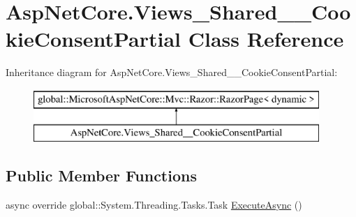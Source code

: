 \hypertarget{class_asp_net_core_1_1_views___shared_____cookie_consent_partial}{}\section{Asp\+Net\+Core.\+Views\+\_\+\+Shared\+\_\+\+\_\+\+Cookie\+Consent\+Partial Class Reference}
\label{class_asp_net_core_1_1_views___shared_____cookie_consent_partial}
Inheritance diagram for Asp\+Net\+Core.\+Views\+\_\+\+Shared\+\_\+\+\_\+\+Cookie\+Consent\+Partial\+:\begin{figure}[H]
\begin{center}
\leavevmode
\includegraphics[height=2.000000cm]{class_asp_net_core_1_1_views___shared_____cookie_consent_partial}
\end{center}
\end{figure}
\subsection*{Public Member Functions}
\begin{DoxyCompactItemize}
\item 
async override global\+::\+System.\+Threading.\+Tasks.\+Task \mbox{\hyperlink{class_asp_net_core_1_1_views___shared_____cookie_consent_partial_a4f0f4a2fb8817375e2d9e2ef6a603624}{Execute\+Async}} ()
\end{DoxyCompactItemize}
